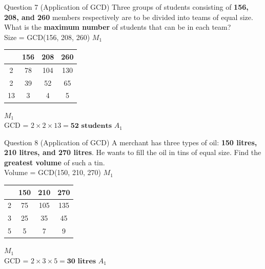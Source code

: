 \documentclass[12pt, a4paper, oneside]{article}
\begin{document}
\begin{solvingbox}{Question 7 (Application of GCD)}
Three groups of students consisting of \textbf{156, 208, and 260} members respectively are to be divided into teams of equal size. What is the \textbf{maximum number} of students that can be in each team? \\
Size = GCD(156, 208, 260) \hfill $M_1$ \\
\begin{tabular}{|c|c|c|c|} \hline
    & \textbf{156} & \textbf{208} & \textbf{260} \\ \hline
    2 & 78 & 104 & 130 \\ \hline
    2 & 39 & 52 & 65 \\ \hline
    13 & 3 & 4 & 5 \\ \hline
\end{tabular} \hfill $M_1$ \\
GCD = $2 \times 2 \times 13 = \mathbf{52\text{ students}}$ \hfill $A_1$
\end{solvingbox}

\begin{solvingbox}{Question 8 (Application of GCD)}
A merchant has three types of oil: \textbf{150 litres, 210 litres, and 270 litres}. He wants to fill the oil in tins of equal size. Find the \textbf{greatest volume} of such a tin. \\
Volume = GCD(150, 210, 270) \hfill $M_1$ \\
\begin{tabular}{|c|c|c|c|} \hline
    & \textbf{150} & \textbf{210} & \textbf{270} \\ \hline
    2 & 75 & 105 & 135 \\ \hline
    3 & 25 & 35 & 45 \\ \hline
    5 & 5 & 7 & 9 \\ \hline
\end{tabular} \hfill $M_1$ \\
GCD = $2 \times 3 \times 5 = \mathbf{30\text{ litres}}$ \hfill $A_1$
\end{solvingbox}
\end{document}
